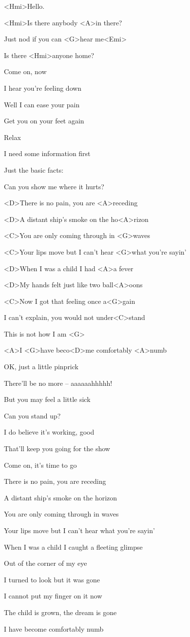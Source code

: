 
\zs
<Hmi>Hello.

<Hmi>Is there anybody <A>in there? 

Just nod if you can <G>hear me<Emi>

Is there <Hmi>anyone home?
\ks

\zs
Come on, now

I hear you’re feeling down

Well I can ease your pain

Get you on your feet again
\ks

\zs
Relax

I need some information first

Just the basic facts:

Can you show me where it hurts? 
\ks

\zr
<D>There is no pain, you are <A>receding

<D>A distant ship’s smoke on the ho<A>rizon

<C>You are only coming through in <G>waves

<C>Your lips move but I can’t hear <G>what you’re sayin’

<D>When I was a child I had <A>a fever

<D>My hands felt just like two ball<A>oons

<C>Now I got that feeling once a<G>gain

I can’t explain, you would not under<C>stand

This is not how I am <G>

<A>I <G>have beco<D>me comfortably <A>numb
\kr

\zs
OK,
just a little pinprick

There’ll be no more -- aaaaaahhhhh!

But you may feel a little sick
\ks

\zs
Can you stand up? 

I do believe it’s working, good

That’ll keep you going for the show

Come on, it’s time to go
\ks

\zr
There is no pain, you are receding

A distant ship’s smoke on the horizon

You are only coming through in waves

Your lips move but I can’t hear what you’re sayin’

When I was a child I caught a fleeting glimpse

Out of the corner of my eye

I turned to look but it was gone

I cannot put my finger on it now

The child is grown, the dream is gone

I have become comfortably numb
\kr
\kp
